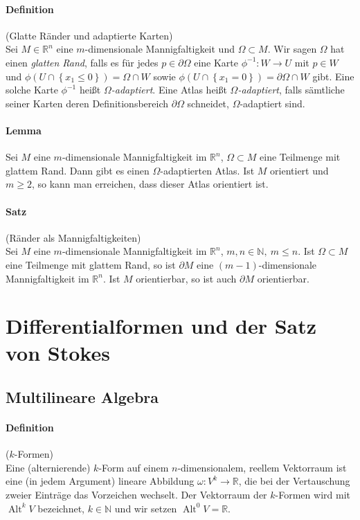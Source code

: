\documentclass[12pt,a4paper,fleqn]{article}
\def\set#1{{\left\{ #1 \right\}}}
\def\R{{\mathbb{R}}}
\begin{document}
\paragraph{Definition} (Glatte Ränder und adaptierte Karten)\\
Sei $M \in \R^n$ eine $m$-dimensionale Mannigfaltigkeit und $\Omega \subset M$. Wir sagen $\Omega$ hat einen \textit{glatten Rand}, falls es für jedes $p \in \partial\Omega$ eine Karte $\phi^{-1}\colon W \rightarrow U$ mit $p \in W$ und $\phi(U \cap \set{x_1 \leq 0}) = \Omega \cap W$ sowie $\phi (U \cap \set{x_1 = 0}) = \partial \Omega \cap W$ gibt. Eine solche Karte $\phi^{-1}$ heißt $\Omega$\textit{-adaptiert}. Eine Atlas heißt $\Omega$\textit{-adaptiert}, falls sämtliche seiner Karten deren Definitionsbereich $\partial\Omega$ schneidet, $\Omega$-adaptiert sind.

\paragraph{Lemma} Sei $M$ eine $m$-dimensionale Mannigfaltigkeit im $\R^n$, $\Omega \subset M$ eine Teilmenge mit glattem Rand. Dann gibt es einen $\Omega$-adaptierten Atlas. Ist $M$ orientiert und $m \geq 2$, so kann man erreichen, dass dieser Atlas orientiert ist.

\paragraph{Satz} (Ränder als Mannigfaltigkeiten)\\
Sei $M$ eine $m$-dimensionale Mannigfaltigkeit im $\R^n$, $m, n \in \mathbb{N},\ m \leq n$. Ist $\Omega \subset M$ eine Teilmenge mit glattem Rand, so ist $\partial M$ eine $(m - 1)$-dimensionale Mannigfaltigkeit im $\R^n$. Ist $M$ orientierbar, so ist auch $\partial M$ orientierbar.

\section{Differentialformen und der Satz von Stokes}

\subsection{Multilineare Algebra}

\paragraph{Definition} ($k$-Formen)\\
Eine (alternierende) $k$-Form auf einem $n$-dimensionalem, reellem Vektorraum ist eine (in jedem Argument) lineare Abbildung $\omega\colon V^k \rightarrow \R$, die bei der Vertauschung zweier Einträge das Vorzeichen wechselt. Der Vektorraum der $k$-Formen wird mit $\operatorname{Alt}^k V$ bezeichnet, $k \in \mathbb{N}$ und wir setzen $\operatorname{Alt}^0 V = \R$.
\end{document}
